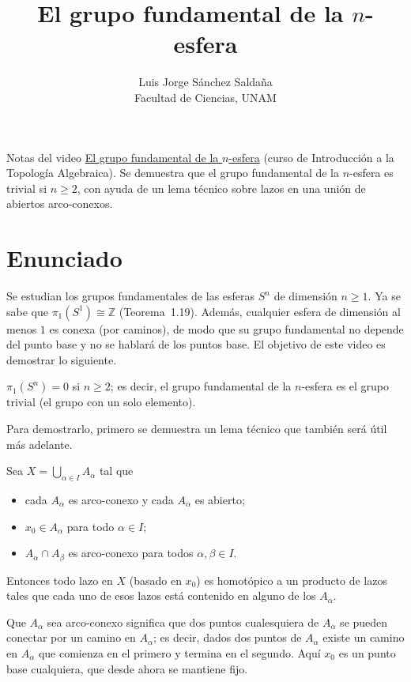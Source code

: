 \documentclass[11pt]{article}
\title{El grupo fundamental de la $n$-esfera}
\author{Luis Jorge Sánchez Saldaña\\[2pt]\small Facultad de Ciencias, UNAM}
\date{}
\begin{document}
\maketitle

\noindent\small Notas del video
\href{https://www.youtube.com/watch?v=y8YsZ3qrOZ4}{\guillemotleft{}El grupo fundamental de la $n$-esfera\guillemotright{}}
(curso de Introducción a la Topología Algebraica). Se demuestra que el grupo fundamental de la $n$-esfera es trivial si $n\geq 2$, con ayuda de un lema técnico sobre lazos en una unión de abiertos arco-conexos.
\normalsize

\section*{Enunciado}

Se estudian los grupos fundamentales de las esferas $S^n$ de dimensión $n\geq 1$. Ya se sabe que $\pi_1(S^1)\cong\mathbb{Z}$ (Teorema~1.19). Además, cualquier esfera de dimensión al menos $1$ es conexa (por caminos), de modo que su grupo fundamental no depende del punto base y no se hablará de los puntos base. El objetivo de este video es demostrar lo siguiente.

\begin{prop}\label{prop:esfera}
$\pi_1(S^n)=0$ si $n\geq 2$; es decir, el grupo fundamental de la $n$-esfera es el grupo trivial (el grupo con un solo elemento).
\end{prop}

Para demostrarlo, primero se demuestra un lema técnico que también será útil más adelante.

\begin{lema}\label{lema:descomposicion}
Sea $X=\bigcup_{\alpha\in I}A_\alpha$ tal que
\begin{itemize}
  \item cada $A_\alpha$ es arco-conexo y cada $A_\alpha$ es abierto;
  \item $x_0\in A_\alpha$ para todo $\alpha\in I$;
  \item $A_\alpha\cap A_\beta$ es arco-conexo para todos $\alpha,\beta\in I$.
\end{itemize}
Entonces todo lazo en $X$ (basado en $x_0$) es homotópico a un producto de lazos tales que cada uno de esos lazos está contenido en alguno de los $A_\alpha$.
\end{lema}

Que $A_\alpha$ sea arco-conexo significa que dos puntos cualesquiera de $A_\alpha$ se pueden conectar por un camino en $A_\alpha$; es decir, dados dos puntos de $A_\alpha$ existe un camino en $A_\alpha$ que comienza en el primero y termina en el segundo. Aquí $x_0$ es un punto base cualquiera, que desde ahora se mantiene fijo.
\end{document}
